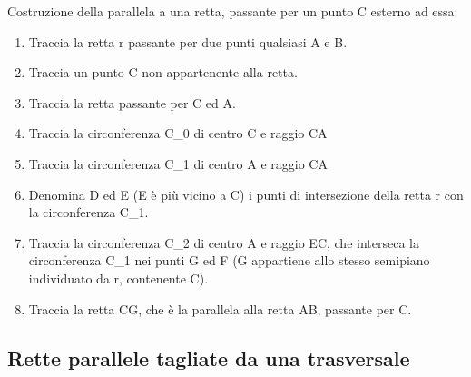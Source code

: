 \begin{procedura}
  Costruzione della parallela a una retta, passante per un punto C esterno ad 
essa:
  \begin{enumerate} [nosep]
    \item 
    Traccia la retta r  passante per due punti qualsiasi A e B.
    \item 
    Traccia un punto C non appartenente alla retta.
    \item 
    Traccia la retta passante per C ed A. 
    \item 
    Traccia la circonferenza C\_0 di centro C e raggio CA  
    \item       
    Traccia la circonferenza C\_1 di centro A e raggio CA
    \item   
    Denomina D ed E (E è più vicino a C) i punti di intersezione della retta r 
con la circonferenza C\_1.  
    \item 
    Traccia la circonferenza C\_2 di centro A e raggio EC, che 
interseca la circonferenza C\_1 nei punti G ed F (G appartiene allo stesso 
semipiano individuato da r, contenente C).
    \item
    Traccia la retta CG, che è la parallela alla retta AB, passante per C.
  \end{enumerate}
\end{procedura}

\subsection{Rette parallele tagliate da una trasversale}


